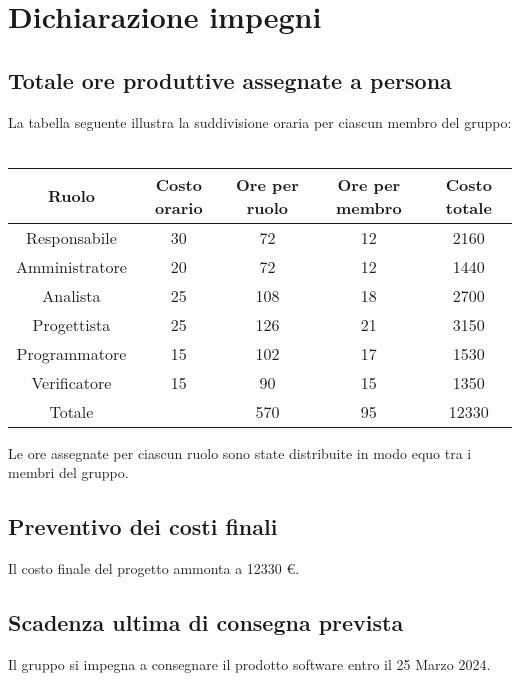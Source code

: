 \documentclass[12pt]{article}
\begin{document}
\section{Dichiarazione impegni}

\subsection{Totale ore produttive assegnate a persona}
La tabella seguente illustra la suddivisione oraria per ciascun membro del gruppo:\\ \\
\begin{tabular}{|c|c|c|c|c|}
\hline
Ruolo & Costo orario & Ore per ruolo & Ore per membro & Costo totale \\
\hline
\hline
Responsabile & 30 & 72 & 12 & 2160 \\
Amministratore & 20 & 72 & 12 & 1440 \\
Analista & 25 & 108 & 18 & 2700 \\
Progettista & 25 & 126 & 21 & 3150 \\
Programmatore & 15 & 102 & 17 & 1530 \\
Verificatore & 15 & 90 & 15 & 1350 \\
\hline
\hline
Totale &  & 570 & 95 & 12330 \\
\hline
\end{tabular}
Le ore assegnate per ciascun ruolo sono state distribuite in modo equo tra i membri del gruppo.

\subsection{Preventivo dei costi finali}
Il costo finale del progetto ammonta a 12330 €.

\subsection{Scadenza ultima di consegna prevista}
Il gruppo si impegna a consegnare il prodotto software entro il 25 Marzo 2024.
\end{document}
